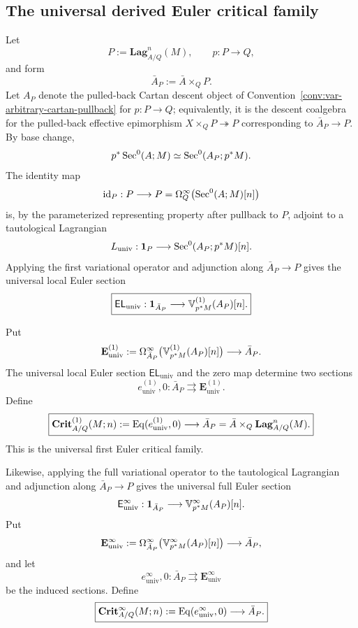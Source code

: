 \subsection{The universal derived Euler critical family}
\label{subsec:var-universal-critical-family}

\begin{construction}
\label{con:var-universal-euler-section}
Let
\[
    P:=\mathbf{Lag}^n_{A/Q}(M),
    \qquad
    p:P\to Q,
\]
and form
\[
    \bar A_P:=\bar A\times_QP.
\]
Let \(A_P\) denote the pulled-back Cartan descent object of Convention~\ref{conv:var-arbitrary-cartan-pullback} for \(p:P\to Q\); equivalently, it is the descent coalgebra for the pulled-back effective epimorphism \(X\times_QP\twoheadrightarrow P\) corresponding to \(\bar A_P\to P\). By base change,
\[
    p^*\operatorname{Sec}^0(A;M)
    \simeq
    \operatorname{Sec}^0(A_P;p^*M).
\]
The identity map
\[
    \operatorname{id}_P:P\longrightarrow
    P=\Omega_Q^\infty\bigl(\operatorname{Sec}^0(A;M)[n]\bigr)
\]
is, by the parameterized representing property after pullback to \(P\), adjoint to a tautological Lagrangian
\[
    L_{\mathrm{univ}}:
    \mathbf 1_P\longrightarrow
    \operatorname{Sec}^0(A_P;p^*M)[n].
\]
Applying the first variational operator and adjunction along \(\bar A_P\to P\) gives the universal local Euler section
\[
    \boxed{
    \mathsf{EL}_{\mathrm{univ}}:
    \mathbf 1_{\bar A_P}
    \longrightarrow
    \mathbb V^{(1)}_{p^*M}(A_P)[n].
    }
\]
\end{construction}

\begin{definition}
\label{def:var-universal-critical-family}
Put
\[
    \mathbf E_{\mathrm{univ}}^{(1)}
    :=
    \Omega_{\bar A_P}^\infty
    \bigl(\mathbb V^{(1)}_{p^*M}(A_P)[n]\bigr)
    \longrightarrow
    \bar A_P.
\]
The universal local Euler section \(\mathsf{EL}_{\mathrm{univ}}\) and the zero map determine two sections
\[
    e_{\mathrm{univ}}^{(1)},0:
    \bar A_P
    \rightrightarrows
    \mathbf E_{\mathrm{univ}}^{(1)}.
\]
Define
\[
    \boxed{
    \mathbf{Crit}^{(1)}_{A/Q}(M;n)
    :=
    \operatorname{Eq}(e_{\mathrm{univ}}^{(1)},0)
    \longrightarrow
    \bar A_P
    =
    \bar A\times_Q\mathbf{Lag}^n_{A/Q}(M).
    }
\]
This is the universal first Euler critical family.

Likewise, applying the full variational operator to the tautological Lagrangian and adjunction along \(\bar A_P\to P\) gives the universal full Euler section
\[
    \mathsf E_{\mathrm{univ}}^{\infty}:
    \mathbf 1_{\bar A_P}
    \longrightarrow
    \mathbb V^{\infty}_{p^*M}(A_P)[n].
\]
Put
\[
    \mathbf E_{\mathrm{univ}}^{\infty}
    :=
    \Omega_{\bar A_P}^\infty
    \bigl(\mathbb V^{\infty}_{p^*M}(A_P)[n]\bigr)
    \longrightarrow
    \bar A_P,
\]
and let
\[
    e_{\mathrm{univ}}^{\infty},0:
    \bar A_P
    \rightrightarrows
    \mathbf E_{\mathrm{univ}}^{\infty}
\]
be the induced sections. Define
\[
    \boxed{
    \mathbf{Crit}^{\infty}_{A/Q}(M;n)
    :=
    \operatorname{Eq}(e_{\mathrm{univ}}^{\infty},0)
    \longrightarrow
    \bar A_P.
    }
\]
\end{definition}

